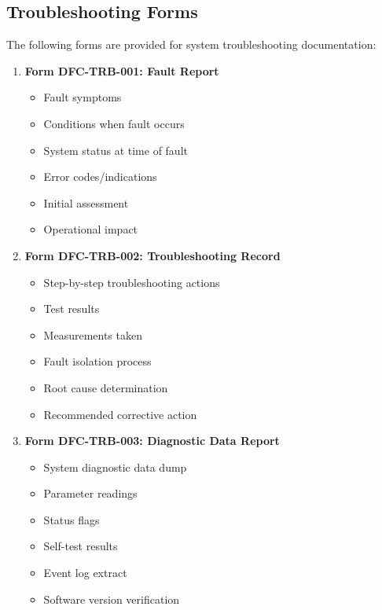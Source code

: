 \documentclass[12pt,a4paper,twoside,openright]{book}
\begin{document}
\subsection{Troubleshooting Forms}

The following forms are provided for system troubleshooting documentation:

\begin{enumerate}
    \item \textbf{Form DFC-TRB-001: Fault Report}
    \begin{itemize}
        \item Fault symptoms
        \item Conditions when fault occurs
        \item System status at time of fault
        \item Error codes/indications
        \item Initial assessment
        \item Operational impact
    \end{itemize}
    
    \item \textbf{Form DFC-TRB-002: Troubleshooting Record}
    \begin{itemize}
        \item Step-by-step troubleshooting actions
        \item Test results
        \item Measurements taken
        \item Fault isolation process
        \item Root cause determination
        \item Recommended corrective action
    \end{itemize}
    
    \item \textbf{Form DFC-TRB-003: Diagnostic Data Report}
    \begin{itemize}
        \item System diagnostic data dump
        \item Parameter readings
        \item Status flags
        \item Self-test results
        \item Event log extract
        \item Software version verification
    \end{itemize}
\end{enumerate}
\end{document}
